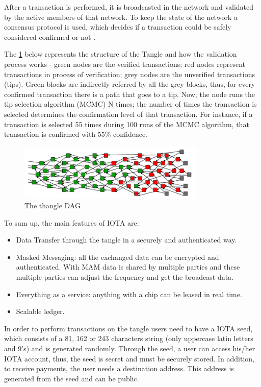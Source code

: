 After a transaction is performed, it is broadcasted in the network and validated by the active members of that network. To keep the state of the network a consensus protocol is used, which decides if a transaction could be safely considered confirmed or not . 

The \cref{fig:tangle} below represents the structure of the Tangle and how the validation process works - green nodes are the verified transactions; red nodes represent transactions in process of verification; grey nodes are the unverified transactions (tips).
Green blocks are indirectly referred by all the grey blocks, thus, for every confirmed transaction there is a path that goes to a tip. Now, the node runs the tip selection algorithm (\ac{MCMC}) N times; the number of times the transaction is selected determines the confirmation level of that transaction. For instance, if a transaction is selected 55 times during 100 runs of the \ac{MCMC} algorithm, that transaction is confirmed with 55\% confidence.



 \begin{figure}[h]
\centering
\includegraphics[width=0.8\textwidth]{./Images/tangle}
\caption{The thangle \ac{DAG}}
\label{fig:tangle}
\end{figure}


To sum up, the main features of IOTA are:
\begin{itemize}
    \item Data Transfer through the tangle in a securely and authenticated way.
    \item Masked Messaging: all the exchanged data can be encrypted and authenticated. With \ac{MAM} data is shared by multiple parties and these multiple parties can adjust the frequency and get the broadcast data.
    \item Everything as a service: anything with a chip can be leased in real time.
    \item Scalable ledger.
\end{itemize}


In order to perform transactions on the tangle users need to have a IOTA seed, which consists of a 81, 162 or 243 characters string (only uppercase latin letters and 9’s) and is generated randomly. Through the seed, a user can access his/her IOTA account, thus, the seed is secret and must be securely stored. In addition, to receive payments, the user needs a destination address. This address is generated from the seed and can be public.


